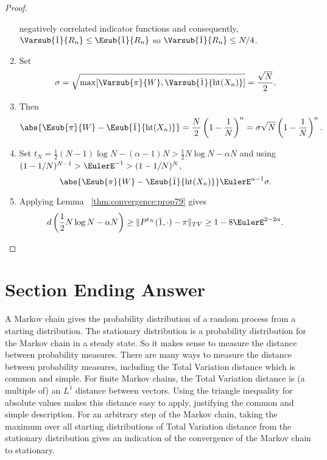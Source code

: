 \documentclass[12pt]{article}
\begin{document}
\begin{proof}
\begin{enumerate}
            negatively correlated indicator functions and consequently, \(
            \Varsub{\bar{1}}{R_n} \le \Esub{\bar{1}}{R_n} \) so \(
            \Varsub{\bar{1}}{R_n} \le N/4 \).
        \item
            Set
            \[
                \sigma = \sqrt{\max[\Varsub{\pi}{W}, \Varsub{\bar{1}}{%
                \operatorname{ht}
                (X_n)}]} = \frac{\sqrt{N}}{2}.
            \]
        \item
            Then
            \[
                \abs{\Esub{\pi}{W} - \Esub{\bar{1}}{%
                \operatorname{ht}
                (X_n)} } = \frac{N}{2} \left( 1 - \frac{1}{N} \right)^n
                = \sigma \sqrt{N} \left( 1 - \frac{1}{N} \right)^n.
            \]
        \item
            Set \( t_N = \frac{1}{2}(N-1)\log N - (\alpha-1)N > \frac{1}
            {2}N \log N - \alpha N \) and using \( (1-1/N)^{N-1} >
            \EulerE^{-1} > (1 - 1/N)^N \),
            \[
                \abs{\Esub{\pi}{W} - \Esub{\bar{1}}{%
                \operatorname{ht}
                (X_n)} } \EulerE^{\alpha-1} \sigma.
            \]
        \item
            Applying Lemma~%
            \ref{thm:convergence:prop79} gives
            \[
                d\left(\frac{1}{2} N \log N - \alpha N \right) \ge \| P^
                {t_N}(\bar{1}, \cdot) - \pi \|_{TV} \ge 1 - 8\EulerE^{2-2\alpha}.
            \]
    \end{enumerate}
\end{proof}

\section*{Section Ending Answer}

A Markov chain gives the probability distribution of a random process
from a starting distribution.  The stationary distribution is a
probability distribution for the Markov chain in a steady state.  So
it makes sense to measure the distance between probability measures.
There are many ways to measure the distance between probability
measures, including the Total Variation distance which is common and
simple.  For finite Markov chains, the Total Variation distance is (a
multiple of) an $L^1$ distance between vectors. Using the triangle
inequality for absolute values makes this distance easy to apply,
justifying the common and simple description.  For an arbitrary step
of the Markov chain, taking the maximum over all starting
distributions of Total Variation distance from the stationary
distribution gives an indication of the convergence of the Markov
chain to stationary.
\end{document}
